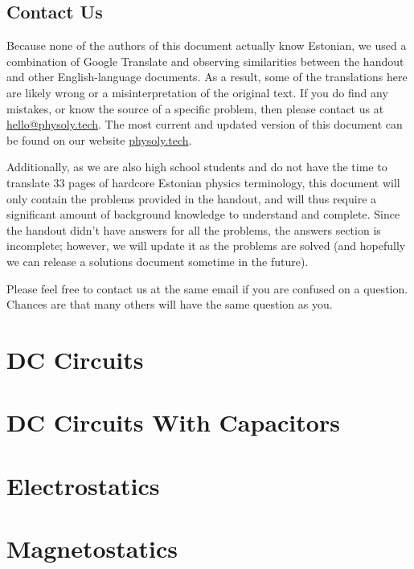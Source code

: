 \documentclass[11pt]{article}
\begin{document}
\subsection*{Contact Us}
\vspace{-5mm}
Because none of the authors of this document actually know Estonian, we used a combination of Google Translate and observing similarities between the handout and other English-language documents. As a result, some of the translations here are likely wrong or a misinterpretation of the original text. If you do find any mistakes, or know the source of a specific problem, then please contact us at \href{mailto:hello@physoly.tech}{hello@physoly.tech}. The most current and updated version of this document can be found on our website \href{https://physoly.tech/}{physoly.tech}.

Additionally, as we are also high school students and do not have the time to translate 33 pages of hardcore Estonian physics terminology, this document will only contain the problems provided in the handout, and will thus require a significant amount of background knowledge to understand and complete. Since the handout didn't have answers for all the problems, the answers section is incomplete; however, we will update it as the problems are solved (and hopefully we can release a solutions document sometime in the future).

Please feel free to contact us at the same email if you are confused on a question. Chances are that many others will have the same question as you.

\newpage
\section{DC Circuits}


\newpage
\section{DC Circuits With Capacitors}


\newpage
\section{Electrostatics}


\newpage
\section{Magnetostatics}

\end{document}
